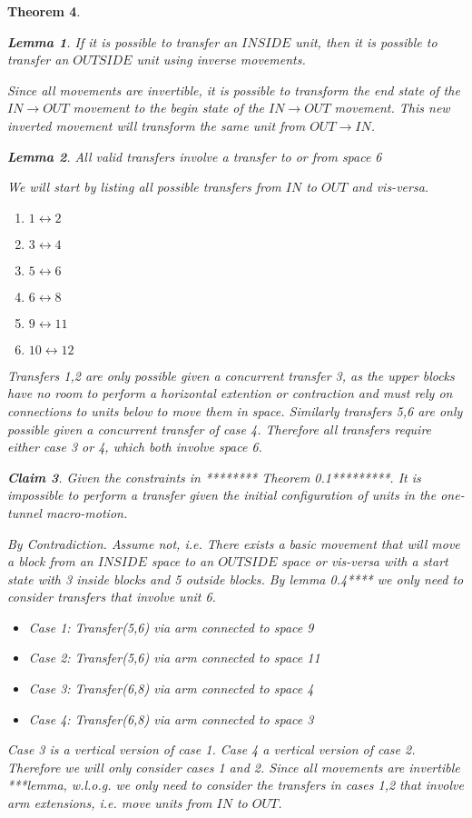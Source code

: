 \documentclass[12pt]{article}
\newtheorem{theorem}{Theorem}[section]
\newtheorem{claim}[theorem]{Claim}
\newtheorem{lemma}[theorem]{Lemma}
\newenvironment{proof}[1][Proof]{\begin{trivlist}
\item[\hskip \labelsep {\bfseries #1}]}{\end{trivlist}}
\begin{document}
\begin{theorem}
\begin{lemma} If it is possible to transfer an $INSIDE$ unit, then it is possible to transfer an $OUTSIDE$ unit using inverse movements.
\end{lemma}
\begin{proof}
Since all movements are invertible, it is possible to transform the end state of the $IN \rightarrow OUT$ movement to the begin state of the $IN \rightarrow OUT$ movement. This new inverted movement will transform the same unit from $OUT \rightarrow IN$.
\end{proof}
\begin{lemma} All valid transfers involve a transfer to or from space 6
\end{lemma}
\begin{proof}
We will start by listing all possible transfers from $IN$ to $OUT$ and vis-versa.
\begin{enumerate}
\item $1 \leftrightarrow 2$
\item $3 \leftrightarrow 4$
\item $5 \leftrightarrow 6$
\item $6 \leftrightarrow 8$
\item $9 \leftrightarrow 11$
\item $10 \leftrightarrow 12$
\end{enumerate}
Transfers 1,2 are only possible given a concurrent transfer 3, as the upper blocks have no room to perform a horizontal extention or contraction and must rely on connections to units below to move them in space. Similarly transfers 5,6 are only possible given a concurrent transfer of case 4. Therefore all transfers require either case 3 or 4, which both involve space 6.
\end{proof}
\begin{claim} Given the constraints in ******** Theorem 0.1*********. It is impossible to perform a transfer given the initial configuration of units in the one-tunnel macro-motion.

By Contradiction. Assume not, i.e. There exists a basic movement that will move a block from an $INSIDE$ space to an $OUTSIDE$ space or vis-versa with a start state with 3 inside blocks and 5 outside blocks. By lemma 0.4**** we only need to consider transfers that involve unit 6. 
\begin{itemize}
\item Case 1: Transfer(5,6) via arm connected to space 9
\item Case 2: Transfer(5,6) via arm connected to space 11
\item Case 3: Transfer(6,8) via arm connected to space 4
\item Case 4: Transfer(6,8) via arm connected to space 3
\end{itemize}
Case 3 is a vertical version of case 1. Case 4 a vertical version of case 2. Therefore we will only consider cases 1 and 2. Since all movements are invertible ***lemma, w.l.o.g. we only need to consider the transfers in cases 1,2 that involve arm extensions, i.e. move units from $IN$ to $OUT$.


\end{claim}
\end{theorem}
\end{document}
